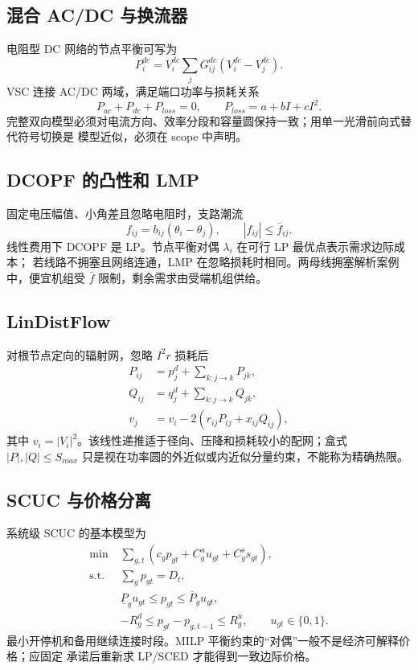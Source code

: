 \subsection{混合 AC/DC 与换流器}
电阻型 DC 网络的节点平衡可写为
\begin{equation}
 P_i^{dc}=V_i^{dc}\sum_jG_{ij}^{dc}(V_i^{dc}-V_j^{dc}).
\end{equation}
VSC 连接 AC/DC 两域，满足端口功率与损耗关系
\begin{equation}
 P_{ac}+P_{dc}+P_{loss}=0,\qquad
 P_{loss}=a+bI+cI^2.
\end{equation}
完整双向模型必须对电流方向、效率分段和容量圆保持一致；用单一光滑前向式替代符号切换是
模型近似，必须在 scope 中声明。

\subsection{DCOPF 的凸性和 LMP}
固定电压幅值、小角差且忽略电阻时，支路潮流
\begin{equation}
 f_{ij}=b_{ij}(\theta_i-\theta_j),\qquad |f_{ij}|\le\bar f_{ij}.
\end{equation}
线性费用下 DCOPF 是 LP。节点平衡对偶 $\lambda_i$ 在可行 LP 最优点表示需求边际成本；
若线路不拥塞且网络连通，LMP 在忽略损耗时相同。两母线拥塞解析案例中，便宜机组受
$\bar f$ 限制，剩余需求由受端机组供给。

\subsection{LinDistFlow}
对根节点定向的辐射网，忽略 $I^2r$ 损耗后
\begin{align}
 P_{ij}&=p_j^d+\sum_{k:j\to k}P_{jk},\\
 Q_{ij}&=q_j^d+\sum_{k:j\to k}Q_{jk},\\
 v_j&=v_i-2(r_{ij}P_{ij}+x_{ij}Q_{ij}),
\end{align}
其中 $v_i=|V_i|^2$。该线性递推适于径向、压降和损耗较小的配网；盒式
$|P|,|Q|\le S_{max}$ 只是视在功率圆的外近似或内近似分量约束，不能称为精确热限。

\subsection{SCUC 与价格分离}
系统级 SCUC 的基本模型为
\begin{align}
 \min\;&\sum_{g,t}(c_gp_{gt}+C_g^uu_{gt}+C_g^ss_{gt}),\\
 \text{s.t. }&\sum_gp_{gt}=D_t,\\
 &\underline P_gu_{gt}\le p_{gt}\le\overline P_gu_{gt},\\
 &-R_g^d\le p_{gt}-p_{g,t-1}\le R_g^u,\qquad u_{gt}\in\{0,1\}.
\end{align}
最小开停机和备用继续连接时段。MILP 平衡约束的“对偶”一般不是经济可解释价格；应固定
承诺后重新求 LP/SCED 才能得到一致边际价格。

